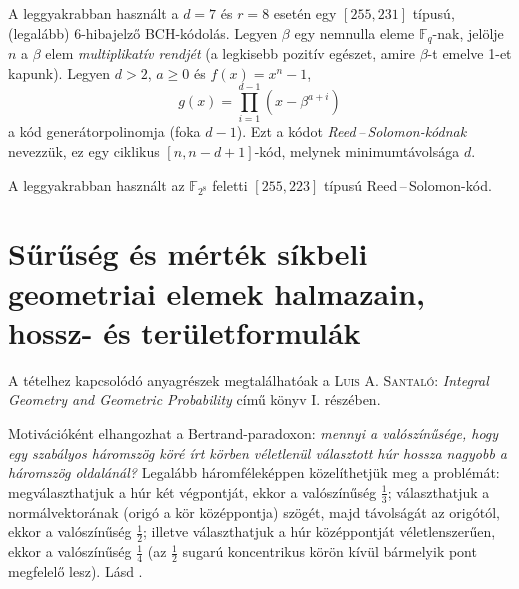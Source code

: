 \documentclass[%
	DIV=15,appendixprefix]{scrreprt}
\theoremstyle{definition}
\theoremstyle{remark}
\begin{document}
A leggyakrabban használt a $ d = 7 $ és $ r = 8 $ esetén egy $ \left[ 255,{} 231 \right] $ típusú,
(legalább) $ 6 $-hibajelző BCH-kódolás.
%
Legyen $ \beta $ egy nemnulla eleme $ \mathbb{ F }_{ q } $-nak, jelölje $ n $ a $ \beta $ elem
\emph{multiplikatív rendjét} (a legkisebb pozitív egészet, amire $ \beta $-t emelve 1-et kapunk).
Legyen $ d > 2 $, $ a \ge 0 $ és $ f \left( x \right) = x^{ n } - 1 $,
\begin{equation*}
	g \left( x \right) = \prod_{ i = 1 }^{ d - 1 } \left( x - \beta^{ a + i } \right)
\end{equation*}
a kód generátorpolinomja (foka $ d - 1 $). Ezt a kódot \emph{Reed\,--\,Solomon-kódnak} nevezzük, ez
egy ciklikus $ \left[ n,{} n - d + 1 \right] $-kód, melynek minimumtávolsága $ d $.

A leggyakrabban használt az $ \mathbb{ F }_{ 2^{ 8 } } $ feletti $ \left[ 255, 223 \right] $ típusú
Reed\,--\,Solomon-kód.
%
\section{Sűrűség és mérték síkbeli geometriai elemek halmazain, hossz- és területformulák}
A tételhez kapcsolódó anyagrészek megtalálhatóak a \textsc{Luis A. Santaló}: \emph{Integral Geometry
and Geometric Probability} \cite{Santalo} című könyv I. részében.

Motivációként elhangozhat a Bertrand-paradoxon: \emph{mennyi a valószínűsége, hogy egy szabályos
háromszög köré írt körben véletlenül választott húr hossza nagyobb a háromszög oldalánál?}
Legalább háromféleképpen közelíthetjük meg a problémát: megválaszthatjuk a húr két végpontját, ekkor
a valószínűség $ \frac{ 1 }{ 3 } $; választhatjuk a normálvektorának (origó a kör középpontja)
szögét, majd távolságát az origótól, ekkor a valószínűség $ \frac{ 1 }{ 2 } $; illetve
választhatjuk a húr középpontját véletlenszerűen, ekkor a valószínűség $ \frac{ 1 }{ 4 } $ (az
$ \frac{ 1 }{ 2 } $ sugarú koncentrikus körön kívül bármelyik pont megfelelő lesz).
%
Lásd \cite[2.~fejezet, 1.~szakasz]{Santalo}.
\end{document}
